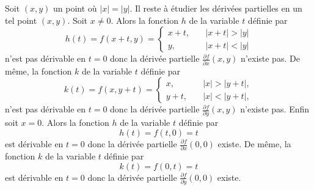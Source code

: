 {{Soit  $(x,y)$ un point o\`u 
$\left|x\right| = \left|y\right|$.
Il reste \`a \'etudier les d\'eriv\'ees partielles en un tel point $(x,y)$.
Soit $x \ne 0$.
Alors la fonction $h$ de la variable $t$ d\'efinie par
\[
h(t)=f(x+t,y)=\begin{cases} x+t,\quad & |x+t|>|y|\\ y,\quad & |x+t|<|y| \end{cases}
\]
n'est pas d\'erivable en $t=0$ donc la d\'eriv\'ee partielle
$\frac{\partial f}{\partial x}(x,y)$ n'existe pas.
De m\^eme,
la fonction $k$ de la variable $t$ d\'efinie par
\[
k(t)=f(x,y+t)=\begin{cases} x,\quad & |x|>|y+t|,\\ y+t,\quad & |x|<|y+t|, \end{cases}
\]
n'est pas d\'erivable en $t=0$ donc la d\'eriv\'ee partielle
$\frac{\partial f}{\partial y}(x,y)$ n'existe pas.
Enfin soit $x = 0$.
Alors la fonction $h$ de la variable $t$ d\'efinie par
\[
h(t)=f(t,0)=t
\]
est d\'erivable en $t=0$ donc la d\'eriv\'ee partielle
$\frac{\partial f}{\partial x}(0,0)$ existe.
De m\^eme,
la fonction $k$ de la variable $t$ d\'efinie par
\[
k(t)=f(0,t)=t
\]
est d\'erivable en $t=0$ donc la d\'eriv\'ee partielle
$\frac{\partial f}{\partial y}(0,0)$ existe.
}
}
